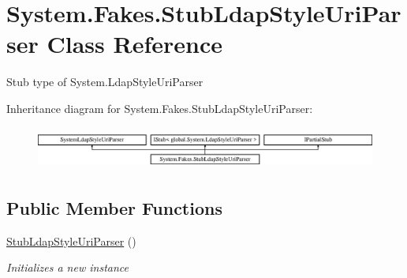 \hypertarget{class_system_1_1_fakes_1_1_stub_ldap_style_uri_parser}{\section{System.\-Fakes.\-Stub\-Ldap\-Style\-Uri\-Parser Class Reference}
\label{class_system_1_1_fakes_1_1_stub_ldap_style_uri_parser}
}


Stub type of System.\-Ldap\-Style\-Uri\-Parser 


Inheritance diagram for System.\-Fakes.\-Stub\-Ldap\-Style\-Uri\-Parser\-:\begin{figure}[H]
\begin{center}
\leavevmode
\includegraphics[height=1.414141cm]{class_system_1_1_fakes_1_1_stub_ldap_style_uri_parser}
\end{center}
\end{figure}
\subsection*{Public Member Functions}
\begin{DoxyCompactItemize}
\item 
\hyperlink{class_system_1_1_fakes_1_1_stub_ldap_style_uri_parser_ad24d684306af748c0dbbc238c9560363}{Stub\-Ldap\-Style\-Uri\-Parser} ()
\begin{DoxyCompactList}\small\item\em Initializes a new instance\end{DoxyCompactList}\end{DoxyCompactItemize}
